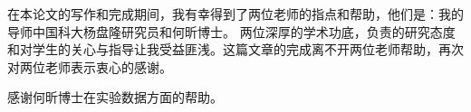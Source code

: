 
\begin{acknowledgements}

%

在本论文的写作和完成期间，我有幸得到了两位老师的指点和帮助，他们是：我的导师中国科大杨盘隆研究员和何昕博士。
两位深厚的学术功底，负责的研究态度和对学生的关心与指导让我受益匪浅。这篇文章的完成离不开两位老师帮助，再次对两位老师表示衷心的感谢。

感谢何昕博士在实验数据方面的帮助。

\end{acknowledgements}
